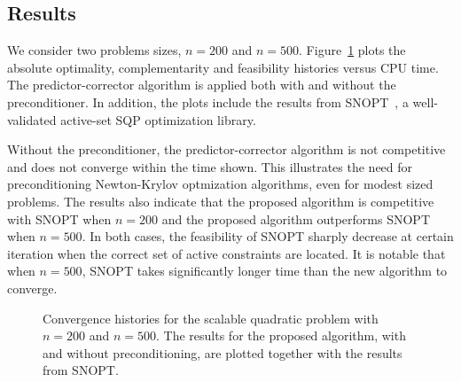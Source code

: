 \subsection{Results}
We consider two problems sizes, $n=200$ and $n=500$. Figure~\ref{fig:quad_hist} plots the absolute optimality, complementarity and feasibility
histories versus CPU time. 
The predictor-corrector algorithm is applied both with and without the preconditioner.  
In addition, the plots include the results
from SNOPT~\cite{gill:2002}, a well-validated active-set SQP
optimization library.

Without the preconditioner, the predictor-corrector algorithm is not competitive
and does not converge within the time shown.  This illustrates the need for preconditioning Newton-Krylov
optmization algorithms, even for modest sized problems.  The results
also indicate that the proposed algorithm is competitive with SNOPT when $n=200$ and the proposed algorithm outperforms SNOPT when $n=500$. In both cases, the feasibility of SNOPT sharply decrease at certain iteration when the correct set of active constraints are located. It is notable that when  $n=500$, SNOPT takes significantly longer time than the new algorithm to converge. 

\begin{figure}[tbp]
  \centering
   \hspace{1em}
   \caption{Convergence histories for the scalable quadratic problem with $n=200$ and
  $n=500$. The results for the proposed algorithm, with and without
  preconditioning, are plotted together with the results from
  SNOPT.\label{fig:quad_hist}}
\end{figure}

